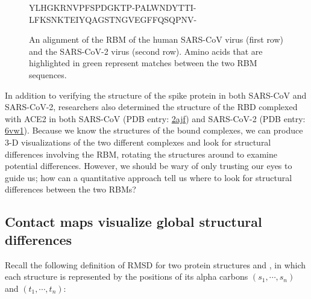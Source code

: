 \begin{figure}[h]
	\centering
	\mySfFamily
	\begin{sequence}[0.58]%
	YLHGKRNVPFSPDGKTP-PALWNDYTTI-\\
	LFKSNKTEIYQAGSTNGVEGFFQSQPNV-
	\end{sequence}
	\caption{An alignment of the RBM of the human SARS-CoV virus (first row) and the SARS-CoV-2 virus (second row). Amino acids that are highlighted in green represent matches between the two RBM sequences.}
	\label{fig:RBM_alignment}
\end{figure}

In addition to verifying the structure of the spike protein in both SARS-CoV and SARS-CoV-2, researchers also determined the structure of the RBD complexed with ACE2 in both SARS-CoV (PDB entry: \href{https://www.rcsb.org/structure/2ajf}{2ajf}) and SARS-CoV-2 (PDB entry: \href{https://www.rcsb.org/structure/6vw1}{6vw1}). Because we know the structures of the bound complexes, we can produce 3-D visualizations of the two different complexes and look for structural differences involving the RBM, rotating the structures around to examine potential differences. However, we should be wary of only trusting our eyes to guide us; how can a quantitative approach tell us where to look for structural differences between the two RBMs?\\

\begin{note}\end{note}

\FloatBarrier
{}
\subsection{Contact maps visualize global structural differences}

Recall the following definition of RMSD for two protein structures  and , in which each structure is represented by the positions of its  alpha carbons $(s_{1}, \cdots, s_{n})$ and $(t_{1}, \cdots, t_{n})$:

